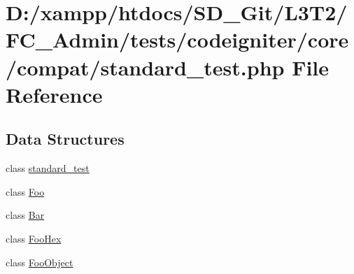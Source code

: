 \hypertarget{standard__test_8php}{}\section{D\+:/xampp/htdocs/\+S\+D\+\_\+\+Git/\+L3\+T2/\+F\+C\+\_\+\+Admin/tests/codeigniter/core/compat/standard\+\_\+test.php File Reference}
\label{standard__test_8php}
\subsection*{Data Structures}
\begin{DoxyCompactItemize}
\item 
class \hyperlink{classstandard__test}{standard\+\_\+test}
\item 
class \hyperlink{class_foo}{Foo}
\item 
class \hyperlink{class_bar}{Bar}
\item 
class \hyperlink{class_foo_hex}{Foo\+Hex}
\item 
class \hyperlink{class_foo_object}{Foo\+Object}
\end{DoxyCompactItemize}
